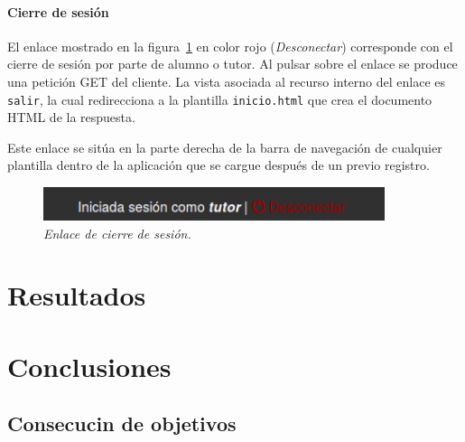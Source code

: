 \documentclass[a4paper, 12pt]{book}
\begin{document}
\subsubsection{Cierre de sesi\'on} 
\label{sec:cierresesion}
El enlace mostrado en la figura~\ref{fig:cierresesion} en color rojo (\textit{Desconectar}) corresponde con el cierre de sesi\'on por parte de alumno o 
tutor. Al pulsar sobre el enlace se produce una petici\'on GET del cliente. La vista asociada al recurso interno del enlace es \texttt{salir}, la cual 
redirecciona a la plantilla \texttt{inicio.html} que crea el documento HTML de la respuesta.

Este enlace se sit\'ua en la parte derecha de la barra de navegaci\'on de cualquier plantilla dentro de la aplicaci\'on que se cargue despu\'es de un previo
registro.
\begin{figure}
  \centering
  \includegraphics[width=10cm, keepaspectratio]{imagenes/CierreSesion}
  \caption{\textit{Enlace de cierre de sesi\'on.}}
  \label{fig:cierresesion}
\end{figure}



\cleardoublepage
\chapter{Resultados}





\cleardoublepage
\chapter{Conclusiones}
\label{chap:conclusiones}


\section{Consecucin de objetivos}
\label{sec:consecucion-objetivos}
\end{document}
